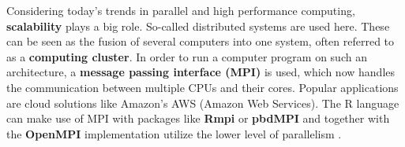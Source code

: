 \documentclass[20pt,margin=1in,innermargin=-4.5in,blockverticalspace=-0.25in]{tikzposter}
\begin{document}
\begin{columns}
{	Considering today's trends in parallel and high performance computing, \textcolor{earthyellow}{\textbf{scalability}} plays a big role. So-called distributed systems are used here. These can be seen as the fusion of several computers into one system, often referred to as a \textbf{computing cluster}. In order to run a computer program on such an architecture, a \textbf{message passing interface (MPI)} is used, which now handles the communication between multiple CPUs and their cores. Popular applications are cloud solutions like Amazon's AWS (Amazon Web Services). The R language can make use of MPI with packages like \textbf{Rmpi} or \textbf{pbdMPI} \cite{cite:chapple2016mastering} and together with the \textbf{OpenMPI} implementation utilize the lower level of parallelism \cite{cite:robey2021parallel}.
	
	}


\end{columns}
\end{document}
